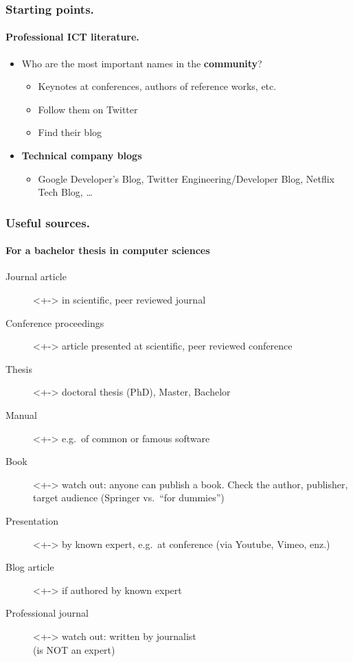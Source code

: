 \documentclass[aspectratio=169]{beamer}
\begin{document}
\begin{frame}
    \frametitle{Starting points.}
    \framesubtitle{Professional ICT literature.}

    \begin{itemize}
        \item<+-> Who are the most important names in the \textbf{community}?
            \begin{itemize}
                \item Keynotes at conferences, authors of reference works, etc.
                \item Follow them on Twitter
                \item Find their blog
            \end{itemize}
        \item<+-> \textbf{Technical company blogs}
            \begin{itemize}
                \item Google Developer's Blog, Twitter Engineering/Developer Blog, Netflix Tech Blog, \dots
            \end{itemize}
    \end{itemize}
\end{frame}


\begin{frame}
    \frametitle{Useful sources.}
    \framesubtitle{For a bachelor thesis in computer sciences}

    \begin{description}
        \item[Journal article]<+-> in scientific, peer reviewed journal
        \item[Conference proceedings]<+-> article presented at scientific, peer reviewed conference
        \item[Thesis]<+-> doctoral thesis (PhD), Master, Bachelor
        \item[Manual]<+-> e.g.\ of common or famous software
        \item[Book]<+-> watch out: anyone can publish a book. Check the author, publisher, target audience (Springer vs.\ ``for dummies'')
        \item[Presentation]<+-> by known expert, e.g.\ at conference (via Youtube, Vimeo, enz.)
        \item[Blog article]<+-> if authored by known expert
        \item[Professional journal]<+-> watch out: written by journalist \\ (is NOT an expert)
    \end{description}
\end{frame}
\end{document}
